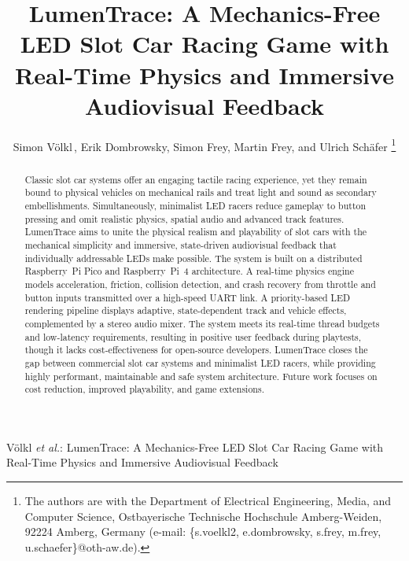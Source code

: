 \documentclass[10pt,journal,final,a4paper]{IEEEtran}
\begin{document}
\title{LumenTrace: A Mechanics-Free LED Slot Car Racing Game with Real-Time Physics and Immersive Audiovisual Feedback} 

\author{Simon Völkl\,, 
        Erik Dombrowsky, 
        Simon Frey,
        Martin Frey,
        and Ulrich Schäfer%
\thanks{The authors are with the Department of Electrical Engineering, Media, and Computer Science, Ostbayerische Technische Hochschule Amberg-Weiden, 92224 Amberg, Germany (e-mail: \{s.voelkl2, e.dombrowsky, s.frey, m.frey, u.schaefer\}@oth-aw.de).}%
}

{Völkl \MakeLowercase{\textit{et al.}}: LumenTrace: A Mechanics-Free LED Slot Car Racing Game with Real-Time Physics and Immersive Audiovisual Feedback}

\maketitle

\begin{abstract}
    Classic slot car systems offer an engaging tactile racing experience, yet they remain bound to physical vehicles on mechanical rails and treat light and sound as secondary embellishments. Simultaneously, minimalist LED racers reduce gameplay to button pressing and omit realistic physics, spatial audio and advanced track features.
    LumenTrace aims to unite the physical realism and playability of slot cars with the mechanical simplicity and immersive, state-driven audiovisual feedback that individually addressable LEDs make possible.
    The system is built on a distributed Raspberry~Pi Pico and Raspberry~Pi~4 architecture. A real-time physics engine models acceleration, friction, collision detection, and crash recovery from throttle and button inputs transmitted over a high-speed UART link. A priority-based LED rendering pipeline displays adaptive, state-dependent track and vehicle effects, complemented by a stereo audio mixer.
    The system meets its real-time thread budgets and low-latency requirements, resulting in positive user feedback during playtests, though it lacks cost-effectiveness for open-source developers. 
    LumenTrace closes the gap between commercial slot car systems and minimalist LED racers, while providing highly performant, maintainable and safe system architecture. Future work focuses on cost reduction, improved playability, and game extensions.
\end{abstract}
\end{document}
